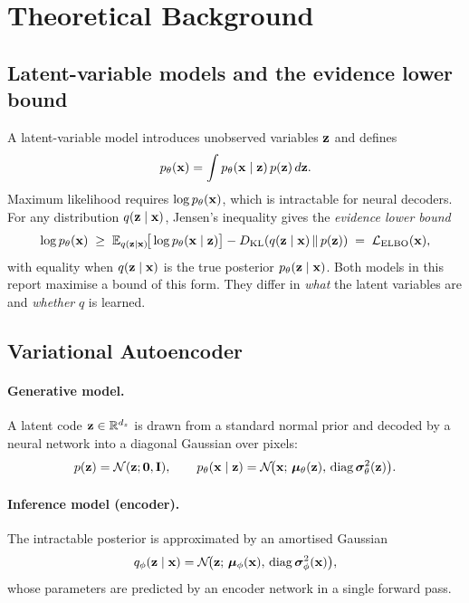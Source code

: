\section{Theoretical Background}
\label{sec:background}

\subsection{Latent-variable models and the evidence lower bound}
A latent-variable model introduces unobserved variables $\mathbf{z}$ and defines
\begin{equation}
  p_\theta(\mathbf{x}) = \int p_\theta(\mathbf{x} \mid \mathbf{z})\, p(\mathbf{z})\, d\mathbf{z} .
\end{equation}
Maximum likelihood requires $\log p_\theta(\mathbf{x})$, which is intractable for neural decoders. For any distribution
$q(\mathbf{z} \mid \mathbf{x})$, Jensen's inequality gives the \emph{evidence lower bound}
\begin{equation}
  \log p_\theta(\mathbf{x}) \;\ge\; \mathbb{E}_{q(\mathbf{z}\mid\mathbf{x})}\!\big[\log p_\theta(\mathbf{x} \mid \mathbf{z})\big] - D_{\mathrm{KL}}\!\left(q(\mathbf{z}\mid\mathbf{x})\,\middle\|\,p(\mathbf{z})\right)
  \;=\; \mathcal{L}_{\mathrm{ELBO}}(\mathbf{x}),
  \label{eq:elbo}
\end{equation}
with equality when $q(\mathbf{z}\mid\mathbf{x})$ is the true posterior $p_\theta(\mathbf{z}\mid\mathbf{x})$. Both models in this report maximise a
bound of this form. They differ in \emph{what} the latent variables are and \emph{whether} $q$ is learned.

\subsection{Variational Autoencoder}
\label{sec:bg-vae}

\paragraph{Generative model.} A latent code $\mathbf{z}\in\mathbb{R}^{d_z}$ is drawn from a standard normal prior and
decoded by a neural network into a diagonal Gaussian over pixels:
\begin{equation}
  p(\mathbf{z}) = \mathcal{N}(\mathbf{z}; \mathbf{0}, \mathbf{I}), \qquad
  p_\theta(\mathbf{x}\mid\mathbf{z}) = \mathcal{N}\!\big(\mathbf{x};\, \bm{\mu}_\theta(\mathbf{z}),\, \operatorname{diag}\bm{\sigma}^2_\theta(\mathbf{z})\big).
\end{equation}

\paragraph{Inference model (encoder).} The intractable posterior is approximated by an amortised Gaussian
\begin{equation}
  q_\phi(\mathbf{z}\mid\mathbf{x}) = \mathcal{N}\!\big(\mathbf{z};\, \bm{\mu}_\phi(\mathbf{x}),\, \operatorname{diag}\bm{\sigma}^2_\phi(\mathbf{x})\big),
\end{equation}
whose parameters are predicted by an encoder network in a single forward pass.

